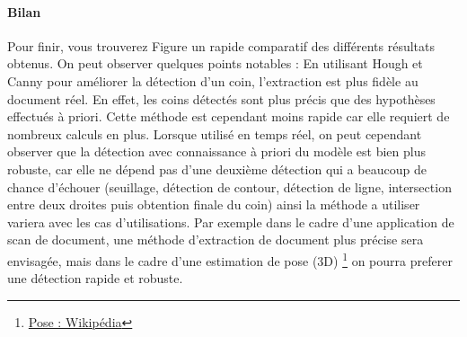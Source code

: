 \paragraph{Bilan}
Pour finir, vous trouverez Figure %
un rapide comparatif des différents résultats obtenus. On peut observer quelques points notables : En utilisant Hough et Canny pour améliorer la détection d'un coin, l'extraction est plus fidèle au document réel. En effet, les coins détectés sont plus précis que des hypothèses effectués à priori. Cette méthode est cependant moins rapide car elle requiert de nombreux calculs en plus. Lorsque utilisé en temps réel, on peut cependant observer que la détection avec connaissance à priori du modèle est bien plus robuste, car elle ne dépend pas d'une deuxième détection qui a beaucoup de chance d'échouer (seuillage, détection de contour, détection de ligne, intersection entre deux droites puis obtention finale du coin) ainsi la méthode a utiliser variera avec les cas d'utilisations. Par exemple dans le cadre d'une application de scan de document, une méthode d'extraction de document plus précise sera envisagée, mais dans le cadre d'une estimation de pose (3D) \footnote{\href{https://en.wikipedia.org/wiki/Pose_(computer_vision)}{Pose : Wikipédia}} on pourra preferer une détection rapide et robuste.

